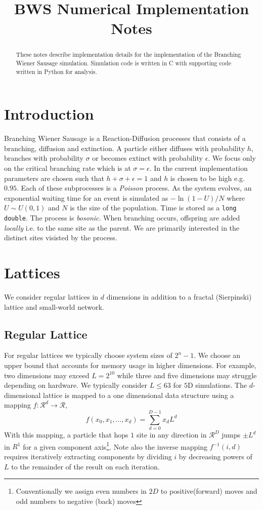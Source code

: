\documentclass[pre,twocolumn,preprintnumbers,amsmath,amssymb,floatfix,nofootinbib]{revtex4}
\begin{document}
\title{BWS Numerical Implementation Notes}
\bigskip
\bigskip


\begin{abstract}
These notes describe implementation details for the implementation of the Branching Wiener Sausage simulation. Simulation code is written in C with supporting code written in Python for analysis.
\end{abstract}


\maketitle


\section{Introduction}\label{introduction}
Branching Wiener Sausage is a Reaction-Diffusion processes that consists of a branching, diffusion and extinction. A particle either diffuses with probability $h$, branches with probability $\sigma$ or becomes extinct with probability $\epsilon$. We focus only on the critical branching rate which is at $\sigma=\epsilon$. In the current implementation parameters are chosen such that $h+\sigma+\epsilon=1$ and $h$ is chosen to be high e.g. $0.95$. Each of these subprocesses is a \textit{Poisson} process. As the system evolves, an exponential waiting time for an event is simulated as $-\ln(1-U)/N$ where $U\sim U(0,1)$ and $N$ is the size of the population. Time is stored as a \verb|long double|. The process is \textit{bosonic}. When branching occurs, offspring are added \textit{locally} i.e. to the same site as the parent. We are primarily interested in the distinct sites visisted by the process.

\section{Lattices}
We consider regular lattices in $d$ dimensions in addition to a fractal (Sierpinski) lattice and small-world network. 
\subsection{Regular Lattice}
For regular lattices we typically choose system sizes of $2^n - 1$. We choose an upper bound that accounts for memory usage in higher dimensions. For example, two dimensions may exceed $L=2^{10}$ while three and five dimensions may struggle depending on hardware. We typically consider $L \leq 63$ for $5$D simulations.
The $d$-dimensional lattice is mapped to a one dimensional data structure using a mapping $f: \mathcal{R}^d\to \mathcal{R}$,
\begin{equation}
f(x_0, x_1,..., x_d) = \sum_{d=0}^{D-1} x_d L^d
\end{equation}
With this mapping, a particle that hops $1$ site in any direction in $\mathcal{R}^D$ jumps $\pm L^d$ in $R^1$ for a given component axis\footnote{Conventionally we assign even numbers in $2D$ to positive(forward) moves and odd numbers to negative (back) moves}. Note also the inverse mapping $f^{-1}(i,d)$ requires iteratively extracting components by dividing $i$ by decreasing powers of $L$ to the remainder of the result on each iteration.
\end{document}
